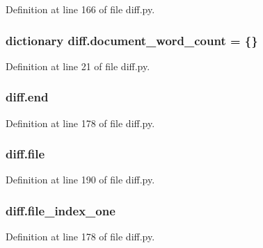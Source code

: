 Definition at line 166 of file diff.\+py.

\subsubsection[{\texorpdfstring{document\+\_\+word\+\_\+count}{document_word_count}}]{\setlength{\rightskip}{0pt plus 5cm}dictionary diff.\+document\+\_\+word\+\_\+count = \{\}}\hypertarget{namespacediff_af16edaaafe4787892cb925870fd0d108}{}\label{namespacediff_af16edaaafe4787892cb925870fd0d108}


Definition at line 21 of file diff.\+py.

\subsubsection[{\texorpdfstring{end}{end}}]{\setlength{\rightskip}{0pt plus 5cm}diff.\+end}\hypertarget{namespacediff_a2839fdf2e0df35c347f0649098c5ecdc}{}\label{namespacediff_a2839fdf2e0df35c347f0649098c5ecdc}


Definition at line 178 of file diff.\+py.

\subsubsection[{\texorpdfstring{file}{file}}]{\setlength{\rightskip}{0pt plus 5cm}diff.\+file}\hypertarget{namespacediff_a3759e132757b6fdecd117a665d6158ab}{}\label{namespacediff_a3759e132757b6fdecd117a665d6158ab}


Definition at line 190 of file diff.\+py.

\subsubsection[{\texorpdfstring{file\+\_\+index\+\_\+one}{file_index_one}}]{\setlength{\rightskip}{0pt plus 5cm}diff.\+file\+\_\+index\+\_\+one}\hypertarget{namespacediff_ac8ee8a35e457d5004c0f85b0383faf26}{}\label{namespacediff_ac8ee8a35e457d5004c0f85b0383faf26}


Definition at line 178 of file diff.\+py.

